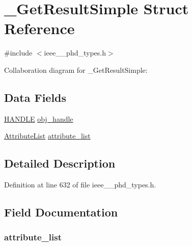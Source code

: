 \hypertarget{struct___get_result_simple}{}\section{\+\_\+\+Get\+Result\+Simple Struct Reference}
\label{struct___get_result_simple}


{\ttfamily \#include $<$ieee\+\_\+\_\+phd\+\_\+types.\+h$>$}



Collaboration diagram for \+\_\+\+Get\+Result\+Simple\+:
\subsection*{Data Fields}
\begin{DoxyCompactItemize}
\item 
\hyperlink{ieee__11073__phd__types_8h_a76f0d44d294babf2e568f7ee676ffca6}{H\+A\+N\+D\+L\+E} \hyperlink{struct___get_result_simple_abbfff52b7a4956021522f5750c4b32c6}{obj\+\_\+handle}
\item 
\hyperlink{ieee__11073__phd__types_8h_a87a34d3be532804006242c172e4beea2}{Attribute\+List} \hyperlink{struct___get_result_simple_a55d9d2bb0279117dc42540f02b5f934c}{attribute\+\_\+list}
\end{DoxyCompactItemize}


\subsection{Detailed Description}


Definition at line 632 of file ieee\+\_\+\_\+phd\+\_\+types.\+h.



\subsection{Field Documentation}
\hypertarget{struct___get_result_simple_a55d9d2bb0279117dc42540f02b5f934c}{}
\subsubsection[{attribute\+\_\+list}]{ attribute\+\_\+list}\label{struct___get_result_simple_a55d9d2bb0279117dc42540f02b5f934c}


